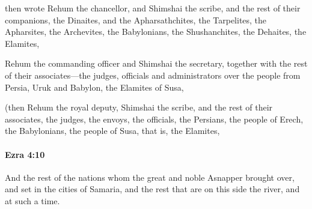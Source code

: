 			\begin{versebox}
					\item[BHS] 
					\item[LXX] 
					\item[ASV] then wrote Rehum the chancellor, and Shimshai the scribe, and the rest of their companions, the Dinaites, and the Apharsathchites, the Tarpelites, the Apharsites, the Archevites, the Babylonians, the Shushanchites, the Dehaites, the Elamites,
					\item[NIV] Rehum the commanding officer and Shimshai the secretary, together with the rest of their associates—the judges, officials and administrators over the people from Persia, Uruk and Babylon, the Elamites of Susa,
					\item[NRSV] (then Rehum the royal deputy, Shimshai the scribe, and the rest of their associates, the judges, the envoys, the officials, the Persians, the people of Erech, the Babylonians, the people of Susa, that is, the Elamites,
			\end{versebox}

		\paragraph{Ezra 4:10} %
			\label{EZRA-4-10}

			And the rest of the nations whom the great and noble Asnapper brought over, and set in the cities of Samaria, and the rest that are on this side the river, and at such a time.


